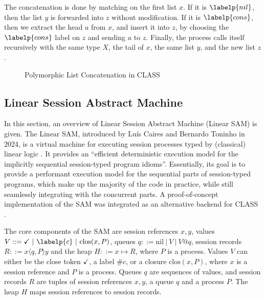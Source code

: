 The concatenation is done by matching on the first list $x$. If it is $\labelp{nil}$, then the list $y$ is forwarded into $z$ without modification. If it is $\labelp{cons}$, then we extract the head $a$ from $x$, and insert it into $z$, by choosing the $\labelp{cons}$ label on $z$ and sending $a$ to $z$. Finally, the process calls itself recursively with the same type $X$, the tail of $x$, the same list $y$, and the new list $z$.

\begin{figure}[H]
    \centering
    \begin{class}
        \z\z
    \end{class}
    \caption{Polymorphic List Concatenation in CLASS}
    \label{fig:CLASSPolymorphismExample}
\end{figure}

\subsection{Linear Session Abstract Machine}

In this section, an overview of Linear Session Abstract Machine (Linear SAM) is given. The Linear SAM, introduced by Luís Caires and Bernardo Toninho in 2024, is a virtual machine for executing session processes typed by (classical) linear logic \cite{Caires:2024}. It provides an ``efficient deterministic execution model for the implicitly sequential session-typed program idioms''. Essentially, its goal is to provide a performant execution model for the sequential parts of session-typed programs, which make up the majority of the code in practice, while still seamlessly integrating with the concurrent parts. A proof-of-concept implementation of the SAM \cite{Caires:2024:artifact} was integrated as an alternative backend for CLASS \cite{Rocha:2022,Rocha:2021:artifact}.

The core components of the SAM are session references $x, y$, values $V ::= \checkmark\ |\ \labelp{c}\ |\ \text{clos}(x, P)$, queues $q ::= \text{nil}\ |\ V\ |\ V@q$, session records $R ::= x\langle q,P\rangle y$ and the heap $H ::= x \mapsto R$, where $P$ is a process. Values $V$ can either be the close token $\checkmark$, a label $\#c$, or a closure $\text{clos}(x, P)$, where $x$ is a session reference and $P$ is a process. Queues $q$ are sequences of values, and session records $R$ are tuples of session references $x, y$, a queue $q$ and a process $P$. The heap $H$ maps session references to session records.

